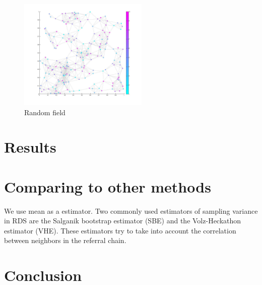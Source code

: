 \documentclass[12pt]{report}
\begin{document}
\begin{figure}[h]
    \centering
    \includegraphics[height=200px]{randomfield}
    \caption{Random field}
\end{figure}

\chapter{Results}

\chapter{Comparing to other methods}

We use mean as a estimator.
Two commonly used estimators of sampling variance in RDS are the Salganik bootstrap estimator (SBE) and the Volz-Heckathon estimator (VHE). These estimators try to take into account the correlation between neighbors in the referral chain.

\chapter{Conclusion}




\end{document}
